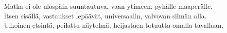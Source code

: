 \documentclass{article}
\begin{document}
\begin{infobox}
Matka ei ole ulospäin suuntautuva, vaan ytimeen, pyhälle maaperälle.\\
Itsen sisällä, vastaukset lepäävät, universaalin, valvovan silmän alla.\\
Ulkoinen etsintä, peilattu näytelmä, heijastaen totuutta omalla tavallaan.
\end{infobox}
\end{document}
